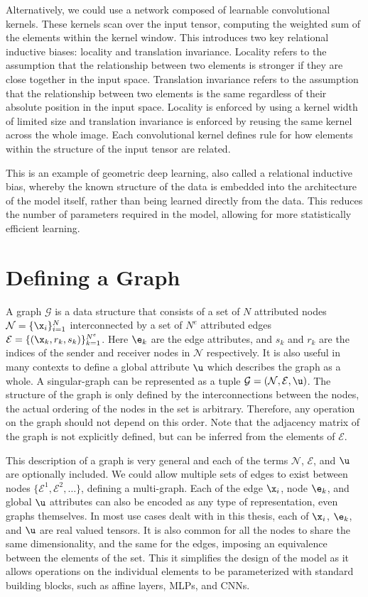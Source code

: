 Alternatively, we could use a network composed of learnable convolutional kernels.
These kernels scan over the input tensor, computing the weighted sum of the elements within the kernel window.
This introduces two key relational inductive biases: locality and translation invariance.
Locality refers to the assumption that the relationship between two elements is stronger if they are close together in the input space.
Translation invariance refers to the assumption that the relationship between two elements is the same regardless of their absolute position in the input space.
Locality is enforced by using a kernel width of limited size and translation invariance is enforced by reusing the same kernel across the whole image.
Each convolutional kernel defines rule for how elements within the structure of the input tensor are related.

This is an example of geometric deep learning, also called a relational inductive bias, whereby the known structure of the data is embedded into the architecture of the model itself, rather than being learned directly from the data.
This reduces the number of parameters required in the model, allowing for more statistically efficient learning.

\section{Defining a Graph}

A graph $\mathcal{G}$ is a data structure that consists of a set of $N$ attributed nodes $\mathcal{N} = \{\x_i\}_{i=1}^{N}$ interconnected by a set of $N^e$ attributed edges $\mathcal{E} = \{(\x_k, r_k, s_k)\}_{k=1}^{N^e}$.
Here $\e_k$ are the edge attributes, and $s_k$ and $r_k$ are the indices of the sender and receiver nodes in $\mathcal{N}$ respectively.
It is also useful in many contexts to define a global attribute $\u$ which describes the graph as a whole.
A singular-graph can be represented as a tuple $\mathcal{G} = (\mathcal{N}, \mathcal{E}, \u)$.
The structure of the graph is only defined by the interconnections between the nodes, the actual ordering of the nodes in the set is arbitrary.
Therefore, any operation on the graph should not depend on this order.
Note that the adjacency matrix of the graph is not explicitly defined, but can be inferred from the elements of $\mathcal{E}$.

This description of a graph is very general and each of the terms $\mathcal{N}$, $\mathcal{E}$, and $\u$ are optionally included.
We could allow multiple sets of edges to exist between nodes $\{\mathcal{E}^1, \mathcal{E}^2, \ldots\}$, defining a multi-graph.
Each of the edge $\x_i$, node $\e_{k}$, and global $\u$ attributes can also be encoded as any type of representation, even graphs themselves.
In most use cases dealt with in this thesis, each of $\x_i$, $\e_k$, and $\u$ are real valued tensors.
It is also common for all the nodes to share the same dimensionality, and the same for the edges, imposing an equivalence between the elements of the set.
This it simplifies the design of the model as it allows operations on the individual elements to be parameterized with standard building blocks, such as affine layers, MLPs, and CNNs.

